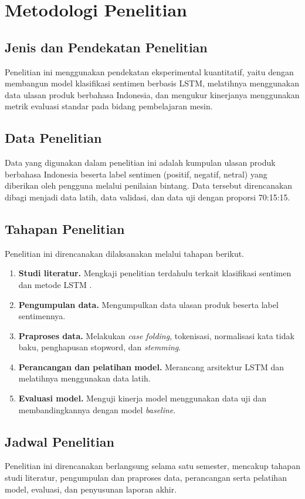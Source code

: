 
\chapter{Metodologi Penelitian}

\section{Jenis dan Pendekatan Penelitian}
Penelitian ini menggunakan pendekatan eksperimental kuantitatif, yaitu
dengan membangun model klasifikasi sentimen berbasis LSTM,
melatihnya menggunakan data ulasan produk berbahasa Indonesia, dan
mengukur kinerjanya menggunakan metrik evaluasi standar pada bidang
pembelajaran mesin.

\section{Data Penelitian}
Data yang digunakan dalam penelitian ini adalah kumpulan ulasan
produk berbahasa Indonesia beserta label sentimen (positif, negatif,
netral) yang diberikan oleh pengguna melalui penilaian bintang. Data
tersebut direncanakan dibagi menjadi data latih, data validasi, dan
data uji dengan proporsi 70:15:15.

\section{Tahapan Penelitian}
Penelitian ini direncanakan dilaksanakan melalui tahapan berikut.
\begin{enumerate}
  \item \textbf{Studi literatur.} Mengkaji penelitian terdahulu terkait
        klasifikasi sentimen dan metode LSTM \citep{example2021}.
  \item \textbf{Pengumpulan data.} Mengumpulkan data ulasan produk
        beserta label sentimennya.
  \item \textbf{Praproses data.} Melakukan \textit{case folding},
        tokenisasi, normalisasi kata tidak baku, penghapusan stopword,
        dan \textit{stemming}.
  \item \textbf{Perancangan dan pelatihan model.} Merancang arsitektur
        LSTM dan melatihnya menggunakan data latih.
  \item \textbf{Evaluasi model.} Menguji kinerja model menggunakan
        data uji dan membandingkannya dengan model \textit{baseline}.
\end{enumerate}

\section{Jadwal Penelitian}
Penelitian ini direncanakan berlangsung selama satu semester,
mencakup tahapan studi literatur, pengumpulan dan praproses data,
perancangan serta pelatihan model, evaluasi, dan penyusunan laporan
akhir.
